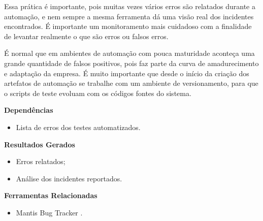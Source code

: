 Essa prática é importante, pois muitas vezes vários erros são relatados durante a automação, e nem sempre a mesma ferramenta dá uma visão real dos incidentes encontrados. É importante um monitoramento mais cuidadoso com a finalidade de levantar realmente o que são erros ou falsos erros.

É normal que em ambientes de automação com pouca maturidade aconteça uma grande quantidade de falsos positivos, pois faz parte da curva de amadurecimento e adaptação da empresa. É muito importante que desde o início da criação dos artefatos de automação se trabalhe com um ambiente de versionamento, para que o scripts de teste evoluam com os códigos fontes do sistema.

\textbf{Dependências}
\begin{itemize}
    \item Lista de erros dos testes automatizados.
\end{itemize}

\textbf{ Resultados Gerados}
\begin{itemize}
    \item Erros relatados;
    \item Análise dos incidentes reportados.
\end{itemize}

\textbf{Ferramentas Relacionadas}
\begin{itemize}
    \item Mantis Bug Tracker \cite{Mantis}.
\end{itemize}




